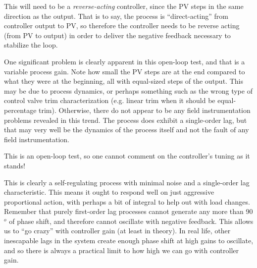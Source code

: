 \vskip 10pt

This will need to be a {\it reverse-acting} controller, since the PV steps in the same direction as the output.  That is to say, the process is ``direct-acting'' from controller output to PV, so therefore the controller needs to be reverse acting (from PV to output) in order to deliver the negative feedback necessary to stabilize the loop.

\vskip 10pt

One significant problem is clearly apparent in this open-loop test, and that is a variable process gain.  Note how small the PV steps are at the end compared to what they were at the beginning, all with equal-sized steps of the output.  This may be due to process dynamics, or perhaps something such as the wrong type of control valve trim characterization (e.g. linear trim when it should be equal-percentage trim).  Otherwise, there do not appear to be any field instrumentation problems revealed in this trend.  The process does exhibit a single-order lag, but that may very well be the dynamics of the process itself and not the fault of any field instrumentation.

\vskip 10pt

This is an open-loop test, so one cannot comment on the controller's tuning as it stands!  

\vskip 10pt

This is clearly a self-regulating process with minimal noise and a single-order lag characteristic.  This means it ought to respond well on just aggressive proportional action, with perhaps a bit of integral to help out with load changes.  Remember that purely first-order lag processes cannot generate any more than 90$^{o}$ of phase shift, and therefore cannot oscillate with negative feedback.  This allows us to ``go crazy'' with controller gain (at least in theory).  In real life, other inescapable lags in the system create enough phase shift at high gains to oscillate, and so there is always a practical limit to how high we can go with controller gain.











